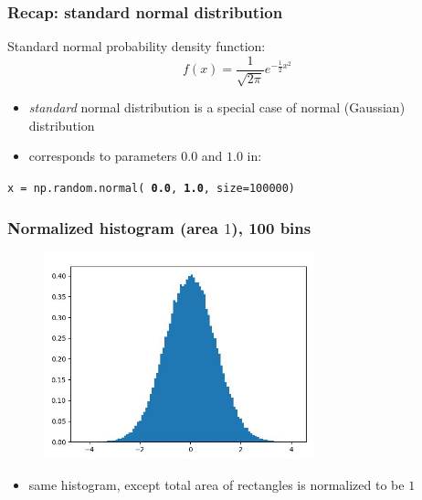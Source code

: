 \documentclass[english,14pt]{beamer}
\newcommand\red[1]{{\color{red} #1}}
\newcommand\blue[1]{{\color{blue} #1}}
\begin{document}

\begin{frame}[fragile]

\frametitle{Recap: standard normal distribution}

Standard normal probability density function:
\[
\boxed{
f(x) = \frac{1}{\sqrt{2\pi}} e^{-\frac{1}{2}x^2}}
\]

\begin{itemize}
	\item \emph{standard} normal distribution is a special case of normal (Gaussian) distribution %
	\item corresponds to parameters \red{$\mathbf{0.0}$} and \blue{$\mathbf{1.0}$} in:
\end{itemize}

{\small
	\texttt{x = np.random.normal(\textbf{\red{0.0}}, \textbf{\blue{1.0}}, size=100000)}
}

\end{frame}


\begin{frame}[fragile]

\frametitle{Normalized histogram (area $1$), 100 bins}

\begin{figure}[ht]
	\centering
	\includegraphics[width=0.7\textwidth]{figures/hist100BinsDensity}
\end{figure}

\vspace*{-5mm}

\begin{itemize}
	\item same histogram, except total area of rectangles is normalized to be $1$
\end{itemize}

\end{frame}
\end{document}
